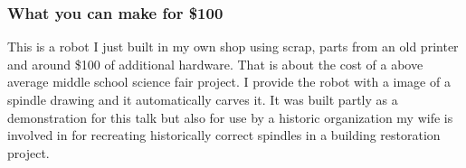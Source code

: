 \documentclass[11pt]{article}
\begin{document}
\subsubsection{What you can make for \$100}
This is a robot I just built in my own shop using scrap, parts from an old printer and around \$100 of additional hardware.  That is about the cost of a above average middle school science fair project.  I provide the robot with a image of a spindle drawing and it automatically carves it.  It was built partly as a demonstration for this talk but also for use by a historic organization my wife is involved in for recreating historically correct spindles in a building restoration project.
\end{document}
